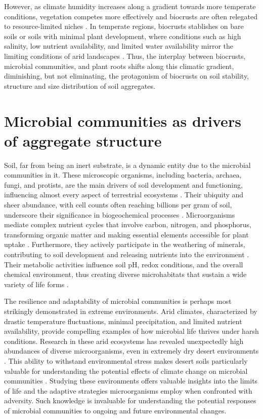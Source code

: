 However, as climate humidity increases along a gradient towards more temperate conditions, vegetation competes more effectively and biocrusts are often relegated to resource-limited niches \citep{Budel2016}. In temperate regions, biocrusts stablishes on bare soils or soils with minimal plant development, where conditions such as high salinity, low nutrient availability, and limited water availability mirror the limiting conditions of arid landscapes \citep{Corbin2020,Gall2022a}. Thus, the interplay between biocrusts, microbial communities, and plant roots shifts along this climatic gradient, diminishing, but not eliminating, the protagonism of biocrusts on soil stability, structure and size distribution of soil aggregates.

\section{Microbial communities as drivers of aggregate structure}
\label{sec:MicrobialCommunitiesAggregateStructure}

Soil, far from being an inert substrate, is a dynamic entity due to the microbial communities in it. These microscopic organisms, including bacteria, archaea, fungi, and protists, are the main drivers of soil development and functioning, influencing almost every aspect of terrestrial ecosystems \citep{Bardgett2014}. Their ubiquity and sheer abundance, with cell counts often reaching billions per gram of soil, underscore their significance in biogeochemical processes \citep{Nunan2001}. Microorganisms mediate complex nutrient cycles that involve carbon, nitrogen, and phosphorus, transforming organic matter and making essential elements accessible for plant uptake \citep{Schimel2012}. Furthermore, they actively participate in the weathering of minerals, contributing to soil development and releasing nutrients into the environment \citep{Barkay2001,Burford2003}. Their metabolic activities influence soil pH, redox conditions, and the overall chemical environment, thus creating diverse microhabitats that sustain a wide variety of life forms \citep{Brehm2005}.

The resilience and adaptability of microbial communities is perhaps most strikingly demonstrated in extreme environments. Arid climates, characterized by drastic temperature fluctuations, minimal precipitation, and limited nutrient availability, provide compelling examples of how microbial life thrives under harsh conditions. Research in these arid ecosystems has revealed unexpectedly high abundances of diverse microorganisms, even in extremely dry desert environments \citep{Bernhard2018,Newsham2016}. This ability to withstand environmental stress makes desert soils particularly valuable for understanding the potential effects of climate change on microbial communities \citep{Pearce2012}. Studying these environments offers valuable insights into the limits of life and the adaptive strategies microorganisms employ when confronted with adversity. Such knowledge is invaluable for understanding the potential responses of microbial communities to ongoing and future environmental changes.

